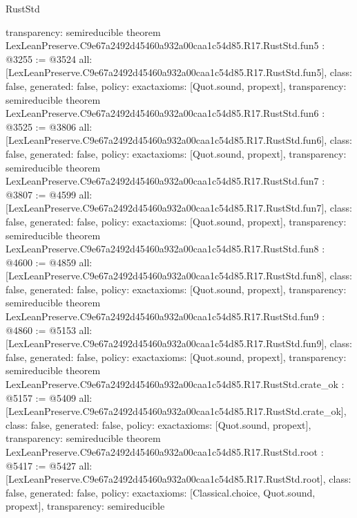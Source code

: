 \begin{lexlean}{RustStd}
\begin{coremodule}
{  transparency: semireducible
}
theorem LexLeanPreserve.C9e67a2492d45460a932a00caa1c54d85.R17.RustStd.fun5 : @3255 := @3524 {
  all: [LexLeanPreserve.C9e67a2492d45460a932a00caa1c54d85.R17.RustStd.fun5],
  class: false,
  generated: false,
  policy: exact{axioms: [Quot.sound, propext]},
  transparency: semireducible
}
theorem LexLeanPreserve.C9e67a2492d45460a932a00caa1c54d85.R17.RustStd.fun6 : @3525 := @3806 {
  all: [LexLeanPreserve.C9e67a2492d45460a932a00caa1c54d85.R17.RustStd.fun6],
  class: false,
  generated: false,
  policy: exact{axioms: [Quot.sound, propext]},
  transparency: semireducible
}
theorem LexLeanPreserve.C9e67a2492d45460a932a00caa1c54d85.R17.RustStd.fun7 : @3807 := @4599 {
  all: [LexLeanPreserve.C9e67a2492d45460a932a00caa1c54d85.R17.RustStd.fun7],
  class: false,
  generated: false,
  policy: exact{axioms: [Quot.sound, propext]},
  transparency: semireducible
}
theorem LexLeanPreserve.C9e67a2492d45460a932a00caa1c54d85.R17.RustStd.fun8 : @4600 := @4859 {
  all: [LexLeanPreserve.C9e67a2492d45460a932a00caa1c54d85.R17.RustStd.fun8],
  class: false,
  generated: false,
  policy: exact{axioms: [Quot.sound, propext]},
  transparency: semireducible
}
theorem LexLeanPreserve.C9e67a2492d45460a932a00caa1c54d85.R17.RustStd.fun9 : @4860 := @5153 {
  all: [LexLeanPreserve.C9e67a2492d45460a932a00caa1c54d85.R17.RustStd.fun9],
  class: false,
  generated: false,
  policy: exact{axioms: [Quot.sound, propext]},
  transparency: semireducible
}
theorem LexLeanPreserve.C9e67a2492d45460a932a00caa1c54d85.R17.RustStd.crate_ok : @5157 := @5409 {
  all: [LexLeanPreserve.C9e67a2492d45460a932a00caa1c54d85.R17.RustStd.crate_ok],
  class: false,
  generated: false,
  policy: exact{axioms: [Quot.sound, propext]},
  transparency: semireducible
}
theorem LexLeanPreserve.C9e67a2492d45460a932a00caa1c54d85.R17.RustStd.root : @5417 := @5427 {
  all: [LexLeanPreserve.C9e67a2492d45460a932a00caa1c54d85.R17.RustStd.root],
  class: false,
  generated: false,
  policy: exact{axioms: [Classical.choice, Quot.sound, propext]},
  transparency: semireducible
}


\end{coremodule}
\end{lexlean}
